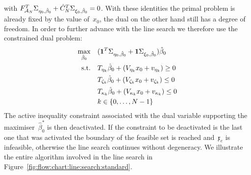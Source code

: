 %
with $F_{\mathcal A_N}^T\Sigma_{\eta_0,\hat\beta_0}+\hat C_N^T\Sigma_{\xi_0,\hat\beta_0}=0$.
%
With these identities the primal problem is already fixed by the value of~$x_0$, the dual on the other hand still has a degree of freedom.
%
In order to further advance with the line search we therefore use the constrained dual problem:
%
\begin{equation}
	\begin{aligned}
	\max_{\hat\beta_0}&\quad  (\mathbf{1}^T\Sigma_{\eta_0,\hat\beta_0}+\mathbf{1}\Sigma_{\xi_0,\hat\beta_0})\hat\beta_0\\
	\text{s.t.}&\quad T_{\eta_k}\hat\beta_0 + (V_{\eta_k}x_0+v_{\eta_k})\geq0\\
	&\quad T_{\zeta_k}\hat\beta_0 + (V_{\zeta_k}x_0+v_{\zeta_k})\leq0\\
	&\quad T_{\kappa_k}\hat\beta_0 + (V_{\kappa_k}x_0+v_{\kappa_k})\leq0\\
	&\quad k\in\{0,\dots,N-1\}
	\end{aligned}
\end{equation}
%
The active inequality constraint associated with the dual variable supporting the maximiser~$\hat\beta_0^\ast$ is then deactivated.
%
If the constraint to be deactivated is the last one that was activated the boundary of the feasible set is reached and~$\mathfrak{x}_e$ is infeasible, otherwise the line search continues without degeneracy.
%
We illustrate the entire algorithm involved in the line search in Figure~\ref{fig:flow:chart:line:search:standard}.
%
